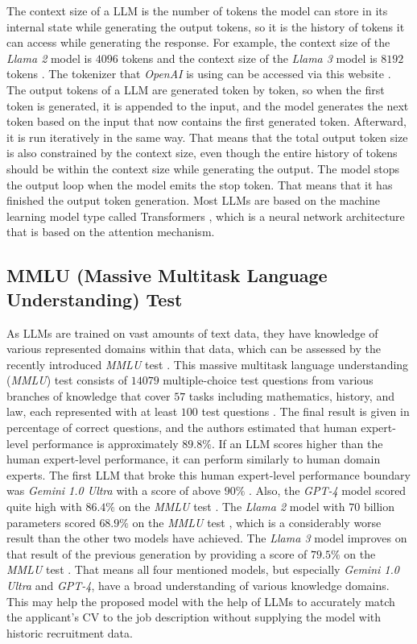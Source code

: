 \documentclass[draft,final]{thesisclass} %
\begin{document}
The context size of a \gls{LLM} is the number of tokens the model can store in its internal state while generating the output tokens, so it is the history of tokens it can access while generating the response.
For example, the context size of the \textit{Llama 2} model is $4096$ tokens \parencite[47]{llama2} and the context size of the \textit{Llama 3} model is $8192$ tokens \parencite[1]{llama3}.
The tokenizer that \textit{OpenAI} is using can be accessed via this website \textcite{openai_tokenizer}.
The output tokens of a \gls{LLM} are generated token by token, so when the first token is generated, it is appended to the input, and the model generates the next token based on the input that now contains the first generated token. Afterward, it is run iteratively in the same way.
That means that the total output token size is also constrained by the context size, even though the entire history of tokens should be within the context size while generating the output.
The model stops the output loop when the model emits the stop token. That means that it has finished the output token generation.
Most \gls{LLM}s are based on the machine learning model type called Transformers \parencite[1]{transformer}, which is a neural network architecture that is based on the attention mechanism.

\subsection{MMLU (Massive Multitask Language Understanding) Test}
As \gls{LLM}s are trained on vast amounts of text data, they have knowledge of various represented domains within that data, which can be assessed by the recently introduced \textit{MMLU} test \parencite{mmlu}.
This massive multitask language understanding (\textit{MMLU}) test consists of $14079$ multiple-choice test questions from various branches of knowledge that cover $57$ tasks including mathematics, history, and law, each represented with at least $100$ test questions \parencite[1-3]{mmlu}.
The final result is given in percentage of correct questions, and the authors estimated that human expert-level performance is approximately $89.8\%$.
If an \gls{LLM} scores higher than the human expert-level performance, it can perform similarly to human domain experts.
The first \gls{LLM} that broke this human expert-level performance boundary was \textit{Gemini 1.0 Ultra} with a score of above $90\%$ \parencite[1]{gemini}.
Also, the \textit{GPT-4} model scored quite high with $86.4\%$ on the \textit{MMLU} test \parencite[32]{gpt4}.
The \textit{Llama 2} model with $70$ billion parameters scored $68.9\%$ on the \textit{MMLU} test \parencite[49]{llama2}, which is a considerably worse result than the other two models have achieved. The \textit{Llama 3} model improves on that result of the previous generation by providing a score of $79.5\%$ on the \textit{MMLU} test \parencite[1]{llama3}.
That means all four mentioned models, but especially \textit{Gemini 1.0 Ultra} and \textit{GPT-4}, have a broad understanding of various knowledge domains.
This may help the proposed model with the help of \gls{LLM}s to accurately match the applicant's \acs{CV} to the job description without supplying the model with historic recruitment data.
\end{document}
